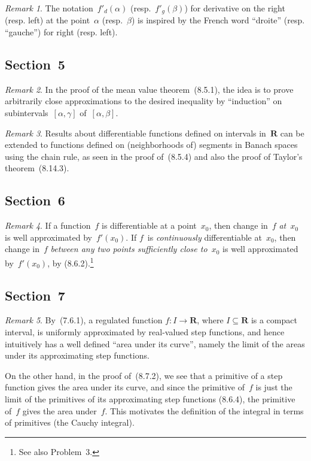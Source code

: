 \documentclass[letterpaper,12pt]{article}
\newcommand{\R}{\mathbf{R}}
\theoremstyle{plain}
\theoremstyle{definition}
\theoremstyle{remark}
\newtheorem*{rmk}{Remark}
\begin{document}
\begin{rmk}
The notation~\(f'_d(\alpha)\) (resp.~\(f'_g(\beta)\)) for derivative on the right (resp. left) at the point~\(\alpha\) (resp.~\(\beta\)) is inspired by the French word ``droite'' (resp. ``gauche'') for right (resp. left).
\end{rmk}

\subsection*{Section~5}
\begin{rmk}
In the proof of the mean value theorem~(8.5.1), the idea is to prove arbitrarily close approximations to the desired inequality by ``induction'' on subintervals~\([\alpha,\gamma]\) of~\([\alpha,\beta]\).
\end{rmk}

\begin{rmk}
Results about differentiable functions defined on intervals in~\(\R\) can be extended to functions defined on (neighborhoods of) segments in Banach spaces using the chain rule, as seen in the proof of~(8.5.4) and also the proof of Taylor's theorem~(8.14.3).
\end{rmk}

\subsection*{Section~6}
\begin{rmk}
If a function~\(f\) is differentiable at a point~\(x_0\), then change in~\(f\) \emph{at~\(x_0\)} is well approximated by~\(f'(x_0)\). If \(f\)~is \emph{continuously} differentiable at~\(x_0\), then change in~\(f\) \emph{between any two points sufficiently close to~\(x_0\)} is well approximated by~\(f'(x_0)\), by (8.6.2).\footnote{See also Problem~3.}
\end{rmk}

\subsection*{Section~7}
\begin{rmk}
By~(7.6.1), a regulated function \(f:I\to\R\), where \(I\subseteq\R\) is a compact interval, is uniformly approximated by real-valued step functions, and hence intuitively has a well defined ``area under its curve'', namely the limit of the areas under its approximating step functions.

On the other hand, in the proof of~(8.7.2), we see that a primitive of a step function gives the area under its curve, and since the primitive of~\(f\) is just the limit of the primitives of its approximating step functions (8.6.4), the primitive of~\(f\) gives the area under~\(f\). This motivates the definition of the integral in terms of primitives (the Cauchy integral).
\end{rmk}
\end{document}
